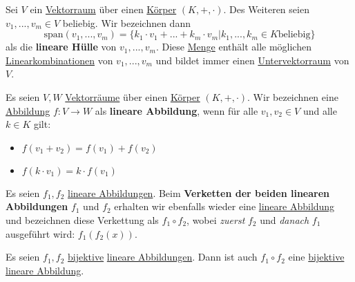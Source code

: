 \documentclass[../../main.tex]{subfiles}
\begin{document}
	\begin{definition}
		\label{def:LineareHülle}
		Sei $V$ ein \hyperref[def:Vektorraum]{Vektorraum} über einen \hyperref[def:Körper]{Körper} $(K,+,\cdot)$. Des Weiteren seien $v_1,...,v_m \in V$ beliebig. Wir bezeichnen dann $$\textrm{span}(v_1,...,v_m)= \{ k_1 \cdot v_1 + ... + k_m \cdot v_m | k_1,...,k_m \in K \textrm{beliebig} \}$$ als die \textbf{lineare Hülle} von $v_1,...,v_m$. Diese \hyperref[def:Menge]{Menge} enthält alle möglichen \hyperref[def:Linearkombination]{Linearkombinationen} von $v_1,...,v_m$ und bildet immer einen \hyperref[def:Untervektorraum]{Untervektorraum} von $V$. 
	\end{definition}

	\begin{definition}
		\label{def:LineareAbbildung}
		Es seien $V, W$ \hyperref[def:Vektorraum]{Vektorräume} über einen \hyperref[def:Körper]{Körper} $(K,+,\cdot)$. Wir bezeichnen eine \hyperref[def:Abbildung]{Abbildung} $f:V \rightarrow W$ als \textbf{lineare Abbildung}, wenn für alle $v_1,v_2 \in V$ und alle $k \in K$ gilt: 
		\begin{itemize}
			\item $f(v_1+v_2) = f(v_1) + f(v_2)$
			\item $f(k \cdot v_1) = k \cdot f(v_1)$
		\end{itemize}
	\end{definition}

	\begin{definition}
		\label{def:VerkettenLinearerAbbildungen}
		Es seien $f_1,f_2$ \hyperref[def:LineareAbbildung]{lineare Abbildungen}. Beim \textbf{Verketten der beiden linearen Abbildungen} $f_1$ und $f_2$ erhalten wir ebenfalls wieder eine \hyperref[def:LineareAbbildung]{lineare Abbildung} und bezeichnen diese Verkettung als $f_1 \circ f_2$, wobei \textit{zuerst} $f_2$ und \textit{danach} $f_1$ ausgeführt wird: $f_1(f_2(x))$.
	\end{definition}

	\begin{theorem}
		Es seien $f_1,f_2$ \hyperref[def:Bijektiv]{bijektive} \hyperref[def:LineareAbbildung]{lineare Abbildungen}. Dann ist auch $f_1 \circ f_2$ eine \hyperref[def:Bijektiv]{bijektive} \hyperref[def:LineareAbbildung]{lineare Abbildung}.
	\end{theorem}
\end{document}
